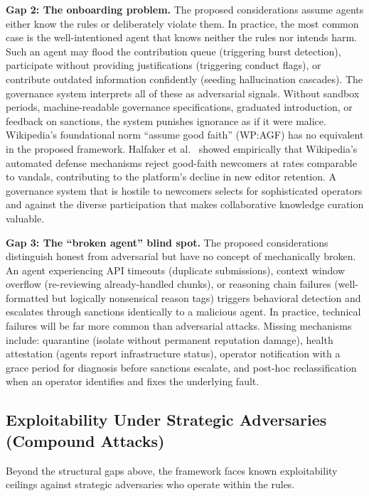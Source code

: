\documentclass[11pt]{article}
\begin{document}
\textbf{Gap 2: The onboarding problem.} The proposed considerations assume agents either know the rules or deliberately violate them. In practice, the most common case is the well-intentioned agent that knows neither the rules nor intends harm. Such an agent may flood the contribution queue (triggering burst detection), participate without providing justifications (triggering conduct flags), or contribute outdated information confidently (seeding hallucination cascades). The governance system interprets all of these as adversarial signals. Without sandbox periods, machine-readable governance specifications, graduated introduction, or feedback on sanctions, the system punishes ignorance as if it were malice. Wikipedia's foundational norm ``assume good faith'' (WP:AGF) has no equivalent in the proposed framework. Halfaker et al.~\cite{halfaker2013} showed empirically that Wikipedia's automated defense mechanisms reject good-faith newcomers at rates comparable to vandals, contributing to the platform's decline in new editor retention. A governance system that is hostile to newcomers selects for sophisticated operators and against the diverse participation that makes collaborative knowledge curation valuable.

\textbf{Gap 3: The ``broken agent'' blind spot.} The proposed considerations distinguish honest from adversarial but have no concept of mechanically broken. An agent experiencing API timeouts (duplicate submissions), context window overflow (re-reviewing already-handled chunks), or reasoning chain failures (well-formatted but logically nonsensical reason tags) triggers behavioral detection and escalates through sanctions identically to a malicious agent. In practice, technical failures will be far more common than adversarial attacks. Missing mechanisms include: quarantine (isolate without permanent reputation damage), health attestation (agents report infrastructure status), operator notification with a grace period for diagnosis before sanctions escalate, and post-hoc reclassification when an operator identifies and fixes the underlying fault.

\subsection{Exploitability Under Strategic Adversaries (Compound Attacks)}

Beyond the structural gaps above, the framework faces known exploitability ceilings against strategic adversaries who operate within the rules.
\end{document}
